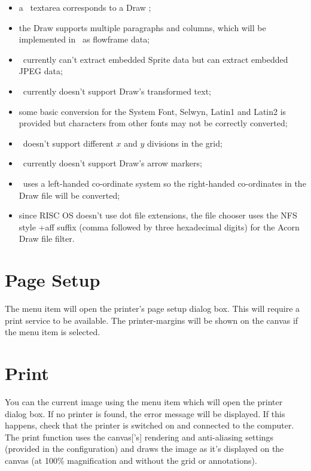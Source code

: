 \begin{itemize}
\item a \FlowframTk\ \gls{textarea} corresponds to a Draw ;
\item the Draw  supports multiple paragraphs
and columns, which will be implemented in \FlowframTk\ as
\gls{flowframe} data;
\item \FlowframTk\ currently can't extract embedded Sprite data
but can extract embedded JPEG data;
\item \FlowframTk\ currently doesn't support Draw's transformed text;
\item some basic conversion for the System Font, Selwyn, Latin1 and
Latin2 is provided but characters from other fonts may not be
correctly converted;
\item \FlowframTk\ doesn't support different $x$ and $y$ divisions
in the \gls{grid};
\item \FlowframTk\ currently doesn't support Draw's arrow markers;
\item \FlowframTk\ uses a left-handed co-ordinate system so the 
right-handed co-ordinates in the Draw file will be converted;
\item since RISC OS doesn't use dot file extensions, the file
chooser uses the NFS style \ext+{aff} suffix (comma followed by three
hexadecimal digits) for the Acorn Draw file filter.
\end{itemize}




\section{Page Setup}\label{sec:pagesetup}


The  menu item will open the printer's page
setup dialog box. This will require a print service to be available.
The \glspl{printer-margin} will be shown on the \gls{canvas} if the
 menu item is selected.

\section{Print}\label{sec:print}


You can  the current image using the  menu
item which will open the printer dialog box. If no printer is found,
the error message  will
be displayed. If this happens, check that the printer is switched
on and connected to the computer. The print function uses the
\gls{canvas}['s] \gls{rendering} and \gls{anti-aliasing} settings
(provided in the  configuration) and draws
the image as it's displayed on the \gls{canvas} (at 100\%
magnification and without the grid or annotations).

